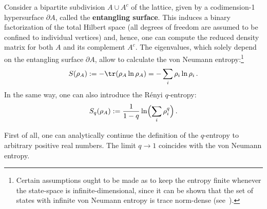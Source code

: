     Consider a bipartite subdivision $A\cup A^c$ of the lattice, given by a codimension-1 hypersurface $\partial A$, called the \textbf{entangling surface}. This induces a binary factorization of the total Hilbert space (all degrees of freedom are assumed to be confined to individual vertices) and, hence, one can compute the reduced density matrix for both $A$ and its complement $A^c$. The eigenvalues, which solely depend on the entangling surface $\partial A$, allow to calculate the von Neumann entropy:\footnote{Certain assumptions ought to be made as to keep the entropy finite whenever the state-space is infinite-dimensional, since it can be shown that the set of states with infinite von Neumann entropy is trace norm-dense (see~\citet{eisert_quantification_2002}).}
    \begin{gather}
        S(\rho_A) := -\tr(\rho_A\ln\rho_A) = -\sum_i\rho_i\ln\rho_i\,.
    \end{gather}
    In the same way, one can also introduce the R\'enyi $q$-entropy:
    \begin{gather}
        S_q(\rho_A) := \frac{1}{1-q}\ln\Bigl(\sum_i\rho_i^q\Bigr)\,.
    \end{gather}
    \begin{property}
         First of all, one can analytically continue the definition of the $q$-entropy to arbitrary positive real numbers. The limit $q\longrightarrow1$ coincides with the von Neumann entropy.
    \end{property}